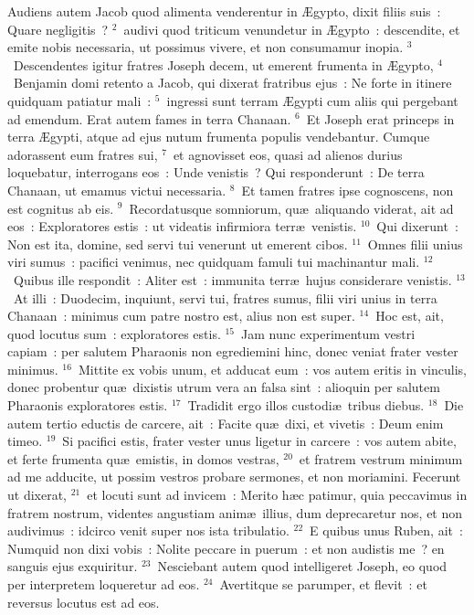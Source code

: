 \lettrine[lines=3,image=true,loversize=0.05,lraise=-0.03]{A}{}udiens autem Jacob quod alimenta venderentur in \AE gypto, dixit filiis suis~: Quare negligitis~?
${}^{2}$~audivi quod triticum venundetur in \AE gypto~: descendite, et emite nobis necessaria, ut possimus vivere, et non consumamur inopia.
${}^{3}$~Descendentes igitur fratres Joseph decem, ut emerent frumenta in \AE gypto,
${}^{4}$~Benjamin domi retento a Jacob, qui dixerat fratribus ejus~: Ne forte in itinere quidquam patiatur mali~:
${}^{5}$~ingressi sunt terram \AE gypti cum aliis qui pergebant ad emendum. Erat autem fames in terra Chanaan.
${}^{6}$~Et Joseph erat princeps in terra \AE gypti, atque ad ejus nutum frumenta populis vendebantur. Cumque adorassent eum fratres sui,
${}^{7}$~et agnovisset eos, quasi ad alienos durius loquebatur, interrogans eos~: Unde venistis~? Qui responderunt~: De terra Chanaan, ut emamus victui necessaria.
${}^{8}$~Et tamen fratres ipse cognoscens, non est cognitus ab eis.
${}^{9}$~Recordatusque somniorum, qu\ae\ aliquando viderat, ait ad eos~: Exploratores estis~: ut videatis infirmiora terr\ae\ venistis.
${}^{10}$~Qui dixerunt~: Non est ita, domine, sed servi tui venerunt ut emerent cibos.
${}^{11}$~Omnes filii unius viri sumus~: pacifici venimus, nec quidquam famuli tui machinantur mali.
${}^{12}$~Quibus ille respondit~: Aliter est~: immunita terr\ae\ hujus considerare venistis.
${}^{13}$~At illi~: Duodecim, inquiunt, servi tui, fratres sumus, filii viri unius in terra Chanaan~: minimus cum patre nostro est, alius non est super.
${}^{14}$~Hoc est, ait, quod locutus sum~: exploratores estis.
${}^{15}$~Jam nunc experimentum vestri capiam~: per salutem Pharaonis non egrediemini hinc, donec veniat frater vester minimus.
${}^{16}$~Mittite ex vobis unum, et adducat eum~: vos autem eritis in vinculis, donec probentur qu\ae\ dixistis utrum vera an falsa sint~: alioquin per salutem Pharaonis exploratores estis.
${}^{17}$~Tradidit ergo illos custodi\ae\ tribus diebus.
${}^{18}$~Die autem tertio eductis de carcere, ait~: Facite qu\ae\ dixi, et vivetis~: Deum enim timeo.
${}^{19}$~Si pacifici estis, frater vester unus ligetur in carcere~: vos autem abite, et ferte frumenta qu\ae\ emistis, in domos vestras,
${}^{20}$~et fratrem vestrum minimum ad me adducite, ut possim vestros probare sermones, et non moriamini. Fecerunt ut dixerat,
${}^{21}$~et locuti sunt ad invicem~: Merito h\ae c patimur, quia peccavimus in fratrem nostrum, videntes angustiam anim\ae\ illius, dum deprecaretur nos, et non audivimus~: idcirco venit super nos ista tribulatio.
${}^{22}$~E quibus unus Ruben, ait~: Numquid non dixi vobis~: Nolite peccare in puerum~: et non audistis me~? en sanguis ejus exquiritur.
${}^{23}$~Nesciebant autem quod intelligeret Joseph, eo quod per interpretem loqueretur ad eos.
${}^{24}$~Avertitque se parumper, et flevit~: et reversus locutus est ad eos.


